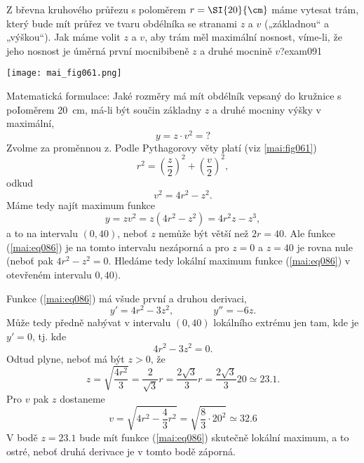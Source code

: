 \begin{mathexam}{Z břevna kruhového průřezu s poloměrem \(r = \protect\SI{20}{\protect\cm}\) máme
  vytesat trám, který bude mít průřez ve tvaru obdélníka se stranami \(z\) a \(v\) („základnou“ a
  „výškou“). Jak máme volit \(z\) a \(v\), aby trám měl maximální nosnost, víme-li, že jeho nosnost
  je úměrná první mocnibibeně \(z\) a druhé mocnině \(v\)?}{exam091}
   
  {\centering
    \captionsetup{type=figure}
    \texttt{[image: mai\_fig061.png]} 
    \label{mai:fig061}
  \par}
  
  Matematická formulace: Jaké rozměry má mít obdélník vepsaný do kružnice s poIoměrem \SI{20}{\cm},
  má-li být součin základny \(z\) a druhé mocniny výšky v maximální,
  \begin{equation*}
    y = z\cdot v^2 = ?
  \end{equation*}
  Zvolme za proměnnou z. Podle Pythagorovy věty platí (viz \ref{mai:fig061})
  \begin{equation*}
      r^2 = \left(\dfrac{z}{2}\right)^2 + \left(\dfrac{v}{2}\right)^2,
  \end{equation*}
  odkud 
  \begin{equation*}
      v^2 = 4r^2 - z^2.
  \end{equation*}
  Máme tedy najít maximum funkce
  \begin{equation}\label{mai:eq086}
      y = zv^2 = z(4r^2 - z^2) = 4r^2z - z^3,
  \end{equation}
  a to na intervalu \((0,40)\), neboť \(z\) nemůže být větší než \(2r = 40\). Ale funkce
  (\ref{mai:eq086}) je na tomto intervalu nezáporná a pro \(z = 0\) a \(z = 40\) je rovna nule
  (neboť pak \(4r^2 - z^2 = 0\). Hledáme tedy lokální maximum funkce (\ref{mai:eq086}) v otevřeném
  intervalu \(0,40)\). 

  Funkce (\ref{mai:eq086}) má všude první a druhou derivaci,
  \begin{equation*}
      y' = 4r^2 - 3z^2, \qquad\qquad y'' = -6z.
  \end{equation*}
  Může tedy předně nabývat v intervalu \((0, 40)\) lokálního extrému jen tam, kde je \(y'=0\), tj.
  kde
  \begin{equation*}
      4r^2 - 3z^2 = 0.
  \end{equation*}
  Odtud plyne, neboť má být \(z > 0\), že
  \begin{equation*}
      z = \sqrt{\dfrac{4r^2}{3}} = \dfrac{2}{\sqrt{3}}r = \dfrac{2\sqrt{3}}{3}r = 
          \dfrac{2\sqrt{3}}{3}20 \simeq \num{23.1}.
  \end{equation*}
  Pro \(v\) pak \(z\) dostaneme
  \begin{equation*}
      v = \sqrt{4r^2 - \dfrac{4}{3}r^2} = \sqrt{\frac{8}{3}\cdot20^2}\simeq\num{32.6}
  \end{equation*}
  V bodě \(z = \num{23.1}\) bude mít funkce (\ref{mai:eq086}) skutečně lokální maximum, a to ostré,
  neboť druhá derivace je v tomto bodě záporná.
\end{mathexam}